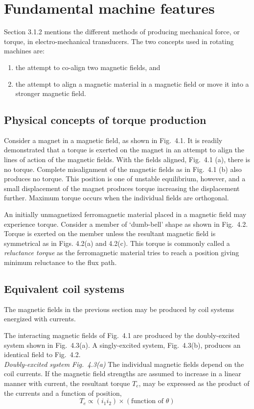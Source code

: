\documentclass[a4paper,numbers=noenddot,12pt]{scrbook}
\begin{document}
            \section{Fundamental machine features} 
            Section 3.1.2 mentions the different methods of producing mechanical force, or torque, in electro-mechanical transducers. The two concepts used in rotating machines are: 
            \begin{enumerate}
                \item the attempt to co-align two magnetic fields, and
                \item the attempt to align a magnetic material in a magnetic field or move it into a stronger magnetic field.
            \end{enumerate}

            \subsection{Physical concepts of torque production}
            Consider a magnet in a magnetic field, as shown in Fig.\ 4.1. It is readily demonstrated that a torque is exerted on the magnet in an attempt to align the lines of action of the magnetic fields. With the fields aligned, Fig.\ 4.1 (a), there is no torque. Complete misalignment of the magnetic fields as in Fig.\ 4.1 (b) also produces no torque. This position is one of unstable equilibrium, however, and a small displacement of the magnet produces torque increasing the displacement further. Maximum torque occurs when the individual fields are orthogonal.

            An initially unmagnetized ferromagnetic material placed in a magnetic field may experience torque. Consider a member of `dumb-bell' shape as shown in Fig.\ 4.2. Torque is exerted on the member unless the resultant magnetic field is symmetrical as in Figs. 4.2(a) and 4.2(c). This torque is commonly called a \textit{reluctance torque} as the ferromagnetic material tries to reach a position giving minimum reluctance to the flux path.

            \subsection{Equivalent coil systems}
            The magnetic fields in the previous section may be produced by coil systems energized with currents.

            The interacting magnetic fields of Fig.\ 4.1 are produced by the doubly-excited system shown in Fig.\ 4.3(a). A singly-excited system,  Fig.\ 4.3(b), produces an identical field to Fig.\ 4.2. \\[12pt]
            \noindent \textit{Doubly-excited system Fig.\ 4.3(a)} The individual magnetic fields depend on the coil currents. If the magnetic field strengths are assumed to increase in a linear manner with current, the resultant torque $T_e$, may be expressed as the product of the currents and a function of position,
            \begin{equation}
                T_e \propto (i_1 i_2) \times (\text{function of } \theta)
                \label{eq:Eq4.1}
            \end{equation}
\end{document}
